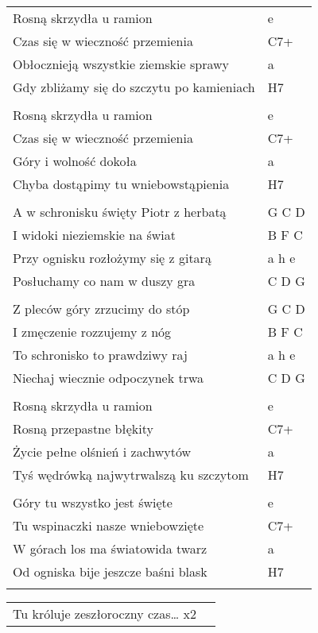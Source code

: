 \documentclass[a5paper]{article}
\begin{document}
\noindent
\begin{tabular}{@{}p{9cm}p{3cm}@{}}
Rosną skrzydła u ramion & e \\
Czas się w wieczność przemienia & C7+ \\
Obłocznieją wszystkie ziemskie sprawy & a \\
Gdy zbliżamy się do szczytu po kamieniach & H7 \\ \\

Rosną skrzydła u ramion & e \\
Czas się w wieczność przemienia & C7+ \\
Góry i wolność dokoła & a \\
Chyba dostąpimy tu wniebowstąpienia & H7 \\ \\

A w schronisku święty Piotr z herbatą & G C D \\
I widoki nieziemskie na świat & B F C \\
Przy ognisku rozłożymy się z gitarą & a h e \\
Posłuchamy co nam w duszy gra & C D G \\ \\

Z pleców góry zrzucimy do stóp & G C D \\
I zmęczenie rozzujemy z nóg & B F C \\
To schronisko to prawdziwy raj & a h e \\
Niechaj wiecznie odpoczynek trwa & C D G \\ \\

Rosną skrzydła u ramion & e \\
Rosną przepastne błękity & C7+ \\
Życie pełne olśnień i zachwytów & a \\
Tyś wędrówką najwytrwalszą ku szczytom & H7 \\ \\

Góry tu wszystko jest święte & e \\
Tu wspinaczki nasze wniebowzięte & C7+ \\
W górach los ma światowida twarz & a \\
Od ogniska bije jeszcze baśni blask & H7 \\ \\
\end{tabular}

\noindent
\begin{tabular}{@{}p{8.5cm}p{3cm}@{}}
Tu króluje zeszłoroczny czas… x2
\end{tabular}
\end{document}
